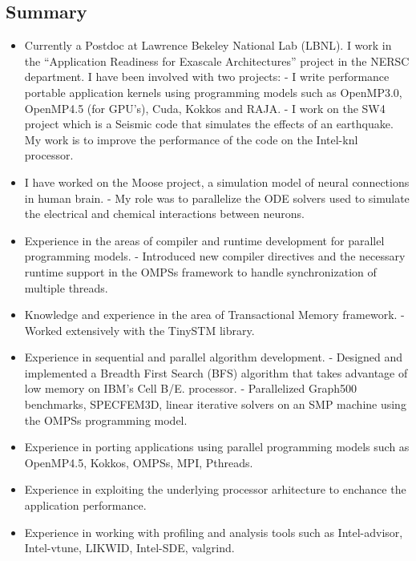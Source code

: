 \documentclass[margin]{res}
\begin{document}
%
\address{
skype\ :\ rahulkumar.gayatri\\
email\ :\ rahulgayatri84@gmail.com\\
phone-number\ :\ 19253848354
}

\begin{resume}
%
  \section{Summary}
  \begin{itemize}
%
      \item Currently a Postdoc at Lawrence Bekeley National Lab (LBNL). I work in the \enquote{Application Readiness for Exascale Architectures} project in the NERSC department.
          I have been involved with two projects:
        \subitem - I write performance portable application kernels using programming models such as OpenMP3.0, OpenMP4.5 (for GPU's), Cuda, Kokkos and RAJA.
        \subitem - I work on the SW4 project which is a Seismic code that simulates the effects of an earthquake.
        My work is to improve the performance of the code on the Intel-knl processor.
%
	   \item I have worked on the Moose project, a simulation model of neural connections in human brain.
			 \subitem - My role was to parallelize the ODE solvers used to simulate the electrical and chemical interactions between neurons.
%
	   \item Experience in the areas of compiler and runtime development for parallel programming models.
			 \subitem - Introduced new compiler directives and the necessary runtime support in the OMPSs framework to handle synchronization of multiple threads.
%
	   \item Knowledge and experience in the area of Transactional Memory framework.
			 \subitem - Worked extensively with the TinySTM library.
%
	   \item  Experience in sequential and parallel algorithm development.
			 \subitem  - Designed and implemented a Breadth First Search (BFS) algorithm that takes advantage of low memory on IBM's Cell B/E. processor.
			 \subitem  - Parallelized Graph500 benchmarks, SPECFEM3D, linear iterative solvers on an SMP machine using the OMPSs programming model.
%
	   \item Experience in porting applications using parallel programming models such as OpenMP4.5, Kokkos, OMPSs, MPI, Pthreads.
%
	   \item Experience in exploiting the underlying processor arhitecture to enchance the application performance.
%
	   \item Experience in working with profiling and analysis tools such as Intel-advisor, Intel-vtune, LIKWID, Intel-SDE, valgrind.
%
  \end{itemize}


\end{resume}
\end{document}
